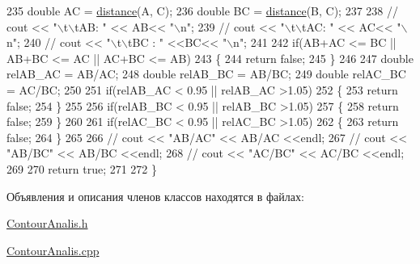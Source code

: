 \begin{DoxyCode}
235     \textcolor{keywordtype}{double} AC = \hyperlink{class_contour_analis_a4f99f88069c6a746805275d21acdf5b2}{distance}(A, C);
236     \textcolor{keywordtype}{double} BC = \hyperlink{class_contour_analis_a4f99f88069c6a746805275d21acdf5b2}{distance}(B, C);
237 
238 \textcolor{comment}{//    cout << "\(\backslash\)t\(\backslash\)tAB: " << AB<< "\(\backslash\)n";}
239 \textcolor{comment}{//    cout << "\(\backslash\)t\(\backslash\)tAC: " << AC<< "\(\backslash\)n";}
240 \textcolor{comment}{//    cout << "\(\backslash\)t\(\backslash\)tBC : " <<BC<< "\(\backslash\)n";}
241 
242     \textcolor{keywordflow}{if}(AB+AC <= BC || AB+BC <= AC || AC+BC <= AB)
243     \{
244         \textcolor{keywordflow}{return} \textcolor{keyword}{false};
245     \}
246 
247     \textcolor{keywordtype}{double} relAB\_AC = AB/AC;
248     \textcolor{keywordtype}{double} relAB\_BC = AB/BC;
249     \textcolor{keywordtype}{double} relAC\_BC = AC/BC;
250 
251     \textcolor{keywordflow}{if}(relAB\_AC < 0.95 || relAB\_AC >1.05)
252     \{
253         \textcolor{keywordflow}{return} \textcolor{keyword}{false};
254     \}
255 
256     \textcolor{keywordflow}{if}(relAB\_BC < 0.95 || relAB\_BC >1.05)
257     \{
258         \textcolor{keywordflow}{return} \textcolor{keyword}{false};
259     \}
260 
261     \textcolor{keywordflow}{if}(relAC\_BC < 0.95 ||  relAC\_BC >1.05)
262     \{
263         \textcolor{keywordflow}{return} \textcolor{keyword}{false};
264     \}
265 
266 \textcolor{comment}{//    cout << "AB/AC" << AB/AC <<endl;}
267 \textcolor{comment}{//    cout << "AB/BC" << AB/BC <<endl;}
268 \textcolor{comment}{//    cout << "AC/BC" << AC/BC <<endl;}
269 
270     \textcolor{keywordflow}{return} \textcolor{keyword}{true};
271 
272 \}
\end{DoxyCode}


Объявления и описания членов классов находятся в файлах\+:\begin{DoxyCompactItemize}
\item 
\hyperlink{_contour_analis_8h}{Contour\+Analis.\+h}\item 
\hyperlink{_contour_analis_8cpp}{Contour\+Analis.\+cpp}\end{DoxyCompactItemize}
